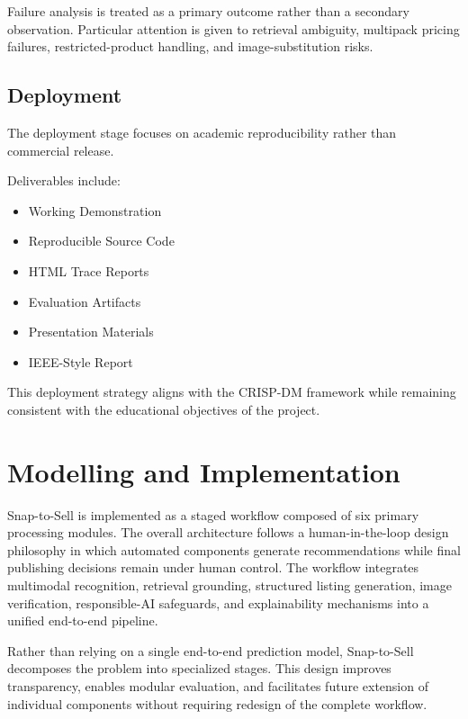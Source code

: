 \documentclass[conference]{IEEEtran}
\begin{document}
Failure analysis is treated as a primary outcome rather than a
secondary observation. Particular attention is given to retrieval
ambiguity, multipack pricing failures, restricted-product
handling, and image-substitution risks.

\subsection{Deployment}

The deployment stage focuses on academic reproducibility rather than
commercial release.

Deliverables include:

\begin{itemize}
\item Working Demonstration
\item Reproducible Source Code
\item HTML Trace Reports
\item Evaluation Artifacts
\item Presentation Materials
\item IEEE-Style Report
\end{itemize}

This deployment strategy aligns with the CRISP-DM framework while
remaining consistent with the educational objectives of the
project.
\section{Modelling and Implementation}

Snap-to-Sell is implemented as a staged workflow composed of six
primary processing modules. The overall architecture follows a
human-in-the-loop design philosophy in which automated components
generate recommendations while final publishing decisions remain
under human control. The workflow integrates multimodal recognition,
retrieval grounding, structured listing generation, image
verification, responsible-AI safeguards, and explainability
mechanisms into a unified end-to-end pipeline.

Rather than relying on a single end-to-end prediction model,
Snap-to-Sell decomposes the problem into specialized stages.
This design improves transparency, enables modular evaluation,
and facilitates future extension of individual components without
requiring redesign of the complete workflow.
\end{document}
